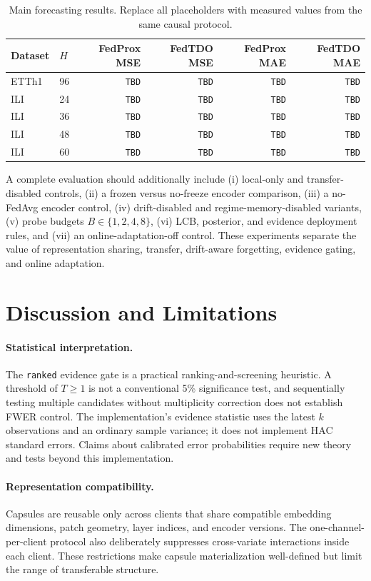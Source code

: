 \documentclass{article}
\newcommand{\TBD}{\texttt{TBD}}
\theoremstyle{definition}
\begin{document}
\begin{table}[t]
\caption{Main forecasting results. Replace all placeholders with measured values from the same causal protocol.}
\label{tab:main-results}
\centering
\small
\begin{tabular}{llrrrr}
\toprule
Dataset & \(H\) & FedProx MSE & FedTDO MSE & FedProx MAE & FedTDO MAE\\
\midrule
ETTh1 & 96 & \TBD & \TBD & \TBD & \TBD\\
ILI & 24 & \TBD & \TBD & \TBD & \TBD\\
ILI & 36 & \TBD & \TBD & \TBD & \TBD\\
ILI & 48 & \TBD & \TBD & \TBD & \TBD\\
ILI & 60 & \TBD & \TBD & \TBD & \TBD\\
\bottomrule
\end{tabular}
\end{table}

A complete evaluation should additionally include (i) local-only and transfer-disabled controls, (ii) a frozen versus no-freeze encoder comparison, (iii) a no-FedAvg encoder control, (iv) drift-disabled and regime-memory-disabled variants, (v) probe budgets \(B\in\{1,2,4,8\}\), (vi) LCB, posterior, and evidence deployment rules, and (vii) an online-adaptation-off control. These experiments separate the value of representation sharing, transfer, drift-aware forgetting, evidence gating, and online adaptation.

\section{Discussion and Limitations}

\paragraph{Statistical interpretation.}
The \texttt{ranked} evidence gate is a practical ranking-and-screening heuristic. A threshold of \(T\ge1\) is not a conventional 5\% significance test, and sequentially testing multiple candidates without multiplicity correction does not establish FWER control. The implementation's evidence statistic uses the latest \(k\) observations and an ordinary sample variance; it does not implement HAC standard errors. Claims about calibrated error probabilities require new theory and tests beyond this implementation.

\paragraph{Representation compatibility.}
Capsules are reusable only across clients that share compatible embedding dimensions, patch geometry, layer indices, and encoder versions. The one-channel-per-client protocol also deliberately suppresses cross-variate interactions inside each client. These restrictions make capsule materialization well-defined but limit the range of transferable structure.
\end{document}
